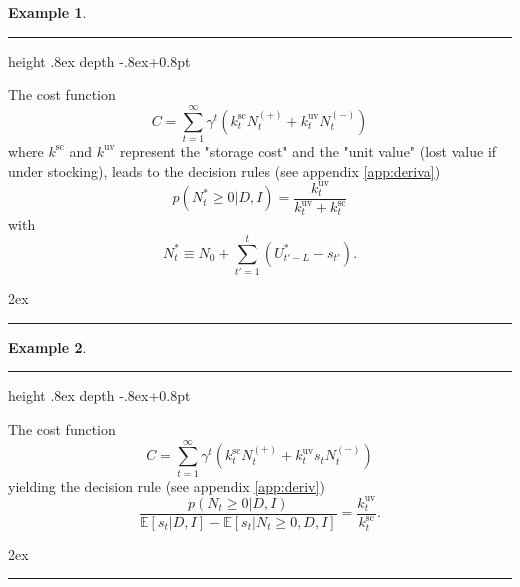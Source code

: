\documentclass[a4paper,12pt]{article}
\theoremstyle{definition}
\newtheorem{exinn}{Example}
\newenvironment{example}
{\clubpenalty=10000
	\begin{exinn}%
		\mbox{}%
		{\color{black}\leaders\hrule height .8ex depth \dimexpr-.8ex+0.8pt\relax\hfill}%
		\mbox{}\linebreak\ignorespaces}
	{\par\kern2ex\hrule\end{exinn}}
\begin{document}
	\begin{example}
		The cost function
		\begin{equation}
			C = \sum_{t=1}^{\infty}\gamma^{t}(k^\text{sc}_{t}N_{t}^{(+)}+k_{t}^\text{uv}N_{t}^{(-)})
		\end{equation}
		where $k^\text{sc}$ and $k^\text{uv}$ represent the "storage cost" and the "unit value" (lost value if under stocking), leads to the decision rules (see appendix \ref{app:deriva})
		\begin{equation}
			p(N_t^*\geq 0|D,I)=\frac{k_{t}^\text{uv}}{k_{t}^\text{uv}+k^\text{sc}_{t}}
			\label{eq:crit1}
		\end{equation}
		with
		\begin{equation}
			N_t^*\equiv N_0+\sum_{t'=1}^{t}(U_{t'-L}^*-s_{t'}).
		\end{equation}
	\end{example}
	
	
	\begin{example}
		The cost function
		\begin{equation}
			C = \sum_{t=1}^{\infty}\gamma^{t}(k^\text{sc}_{t}N_{t}^{(+)}+k_{t}^\text{uv}s_{t}N_{t}^{(-)})
		\end{equation}
		yielding the decision rule (see appendix \ref{app:deriv})
		\begin{equation}
			\frac{p(N_t\geq 0|D,I)}{\mathbb{E}[s_t|D,I]-\mathbb{E}[s_t|N_{t}\geq 0,D,I]}=\frac{k_{t}^\text{uv}}{k^\text{sc}_{t}}.
			\label{eq:crit2}
		\end{equation}
	\end{example}

	
	\newpage
	\begin{appendices}
		
		
	\end{appendices}
	
	
	
	
	
	
\end{document}
